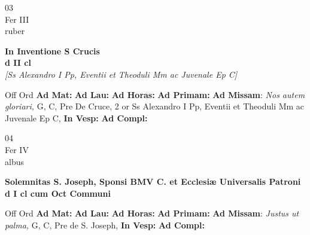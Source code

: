 \documentclass[10pt, openany]{book}
\begin{document}
        \begin{center}
            \begin{minipage}{3.5in}
                \vspace{2em}
                \begin{minipage}{0.5in}
                    {\Huge 03} \\
                    {\normalsize Fer III} \\
                    {\normalsize ruber}
                \end{minipage}
                \begin{minipage}{3.0in}
                    \textbf{ \large In Inventione S Crucis \\
                    \textnormal{\normalsize d II cl}} \\ \textit{[Ss Alexandro I Pp, Eventii et Theoduli Mm ac Juvenale Ep C]} \\ 
                \end{minipage}
                \begin{justify}Off Ord
                    \textbf{Ad Mat: }
                    \textbf{Ad Lau: }
                    \textbf{Ad Horas: }
                    \textbf{Ad Primam: }\textbf{Ad Missam}: \textit{Nos autem gloriari,} G, C, Pre De Cruce, 2 or Ss Alexandro I Pp, Eventii et Theoduli Mm ac Juvenale Ep C,  
                    \textbf{In Vesp: }
                    \textbf{Ad Compl: }
                \end{justify}
            \end{minipage}
        \end{center}
    
        \begin{center}
            \begin{minipage}{3.5in}
                \vspace{2em}
                \begin{minipage}{0.5in}
                    {\Huge 04} \\
                    {\normalsize Fer IV} \\
                    {\normalsize albus}
                \end{minipage}
                \begin{minipage}{3.0in}
                    \textbf{ \large Solemnitas S. Joseph, Sponsi BMV C. et Ecclesiæ Universalis Patroni \\
                    \textnormal{\normalsize d I cl cum Oct Communi}} \\ 
                \end{minipage}
                \begin{justify}Off Ord
                    \textbf{Ad Mat: }
                    \textbf{Ad Lau: }
                    \textbf{Ad Horas: }
                    \textbf{Ad Primam: }\textbf{Ad Missam}: \textit{Justus ut palma,} G, C, Pre de S. Joseph,  
                    \textbf{In Vesp: }
                    \textbf{Ad Compl: }
                \end{justify}
            \end{minipage}
        \end{center}
    
\end{document}
